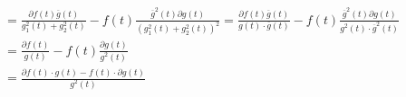 \documentclass[12pt,UTF8]{ctexbook}
\theoremstyle{definition}
\theoremstyle{plain}
\begin{document}
\begin{align*}
%
    &= \frac{\partial f(t)\overline{g}(t)}{g_1^2(t) + g_2^2 (t)} - f(t)\frac{ \overline{g}^2(t) \partial g(t) }{\left(g_1^2(t) + g_2^2 (t)\right)^2} = \frac{\partial f(t)\overline{g}(t)}{g(t) \cdot \overline{g}(t)} - f(t)\frac{ \overline{g}^2(t) \partial g(t) }{g^2(t) \cdot \overline{g}^2(t)} \\
    &= \frac{\partial f(t)}{g(t)} - f(t)\frac{  \partial g(t) }{g^2(t) } \\
    &= \frac{\partial f(t) \cdot g(t) - f(t) \cdot \partial g(t) }{g^2(t) }
\end{align*}
\end{document}
